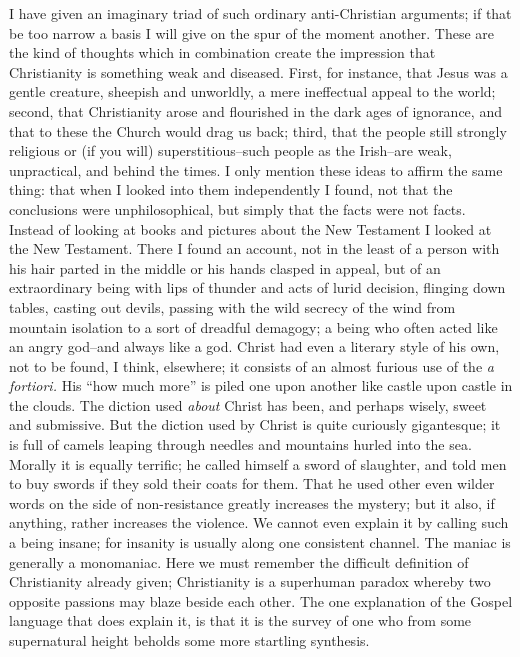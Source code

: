 \documentclass{book}
\begin{document}
I have given an imaginary triad of such ordinary anti-Christian arguments; if that be too narrow a basis I will give on the spur of the moment another. These are the kind of thoughts which in combination create the impression that Christianity is something weak and diseased. First, for instance, that Jesus was a gentle creature, sheepish and unworldly, a mere ineffectual appeal to the world; second, that Christianity arose and flourished in the dark ages of ignorance, and that to these the Church would drag us back; third, that the people still strongly religious or (if you will) superstitious–such people as the Irish–are weak, unpractical, and behind the times. I only mention these ideas to affirm the same thing: that when I looked into them independently I found, not that the conclusions were unphilosophical, but simply that the facts were not facts. Instead of looking at books and pictures about the New Testament I looked at the New Testament. There I found an account, not in the least of a person with his hair parted in the middle or his hands clasped in appeal, but of an extraordinary being with lips of thunder and acts of lurid decision, flinging down tables, casting out devils, passing with the wild secrecy of the wind from mountain isolation to a sort of dreadful demagogy; a being who often acted like an angry god–and always like a god. Christ had even a literary style of his own, not to be found, I think, elsewhere; it consists of an almost furious use of the \emph{a fortiori.} His “how much more” is piled one upon another like castle upon castle in the clouds. The diction used \emph{about} Christ has been, and perhaps wisely, sweet and submissive. But the diction used by Christ is quite curiously gigantesque; it is full of camels leaping through needles and mountains hurled into the sea. Morally it is equally terrific; he called himself a sword of slaughter, and told men to buy swords if they sold their coats for them. That he used other even wilder words on the side of non-resistance greatly increases the mystery; but it also, if anything, rather increases the violence. We cannot even explain it by calling such a being insane; for insanity is usually along one consistent channel. The maniac is generally a monomaniac. Here we must remember the difficult definition of Christianity already given; Christianity is a superhuman paradox whereby two opposite passions may blaze beside each other. The one explanation of the Gospel language that does explain it, is that it is the survey of one who from some supernatural height beholds some more startling synthesis.
\end{document}
